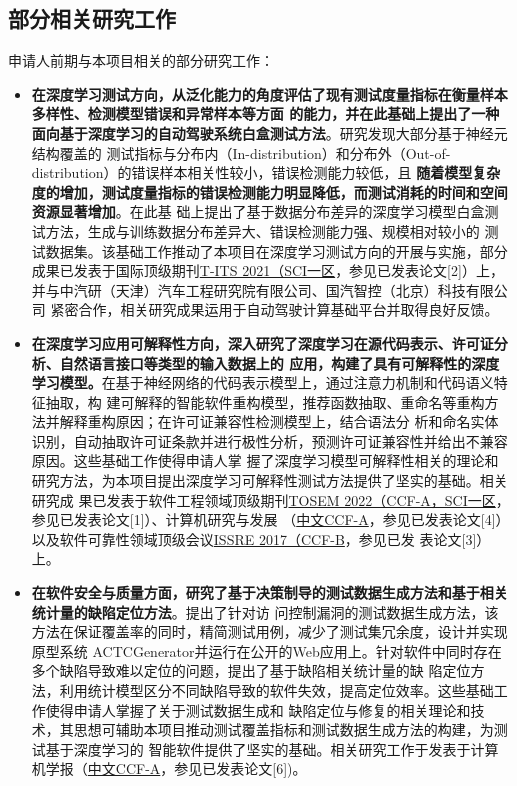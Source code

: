 \documentclass[a4paper,zihao=-4]{article}
\begin{document}
\subsection{部分相关研究工作}


申请人前期与本项目相关的部分研究工作：

\begin{itemize}
	\item \textbf{在深度学习测试方向，从泛化能力的角度评估了现有测试度量指标在衡量样本多样性、检测模型错误和异常样本等方面
		      的能力，并在此基础上提出了一种面向基于深度学习的自动驾驶系统白盒测试方法}。研究发现大部分基于神经元结构覆盖的
	      测试指标与分布内（In-distribution）和分布外（Out-of-distribution）的错误样本相关性较小，错误检测能力较低，且
	      \textbf{随着模型复杂度的增加，测试度量指标的错误检测能力明显降低，而测试消耗的时间和空间资源显著增加}。在此基
	      础上提出了基于数据分布差异的深度学习模型白盒测试方法，生成与训练数据分布差异大、错误检测能力强、规模相对较小的
	      测试数据集。该基础工作推动了本项目在深度学习测试方向的开展与实施，部分成果已发表于国际顶级期刊\underline{T-ITS
		      2021（SCI一区}，参见已发表论文[2]）上，并与中汽研（天津）汽车工程研究院有限公司、国汽智控（北京）科技有限公司
	      紧密合作，相关研究成果运用于自动驾驶计算基础平台并取得良好反馈。

	\item \textbf{在深度学习应用可解释性方向，深入研究了深度学习在源代码表示、许可证分析、自然语言接口等类型的输入数据上的
		      应用，构建了具有可解释性的深度学习模型。}在基于神经网络的代码表示模型上，通过注意力机制和代码语义特征抽取，构
	      建可解释的智能软件重构模型，推荐函数抽取、重命名等重构方法并解释重构原因；在许可证兼容性检测模型上，结合语法分
	      析和命名实体识别，自动抽取许可证条款并进行极性分析，预测许可证兼容性并给出不兼容原因。这些基础工作使得申请人掌
	      握了深度学习模型可解释性相关的理论和研究方法，为本项目提出深度学习可解释性测试方法提供了坚实的基础。相关研究成
	      果已发表于软件工程领域顶级期刊\underline{TOSEM 2022（CCF-A，SCI一区}，参见已发表论文[1]）、计算机研究与发展
	      （\underline{中文CCF-A}，参见已发表论文[4]）以及软件可靠性领域顶级会议\underline{ISSRE 2017（CCF-B}，参见已发
	      表论文[3]）上。

	\item \textbf{在软件安全与质量方面，研究了基于决策制导的测试数据生成方法和基于相关统计量的缺陷定位方法}。提出了针对访
	      问控制漏洞的测试数据生成方法，该方法在保证覆盖率的同时，精简测试用例，减少了测试集冗余度，设计并实现原型系统
	      ACTCGenerator并运行在公开的Web应用上。针对软件中同时存在多个缺陷导致难以定位的问题，提出了基于缺陷相关统计量的缺
	      陷定位方法，利用统计模型区分不同缺陷导致的软件失效，提高定位效率。这些基础工作使得申请人掌握了关于测试数据生成和
	      缺陷定位与修复的相关理论和技术，其思想可辅助本项目推动测试覆盖指标和测试数据生成方法的构建，为测试基于深度学习的
	      智能软件提供了坚实的基础。相关研究工作于发表于计算机学报（\underline{中文CCF-A}，参见已发表论文[6])。
\end{itemize}
\end{document}
